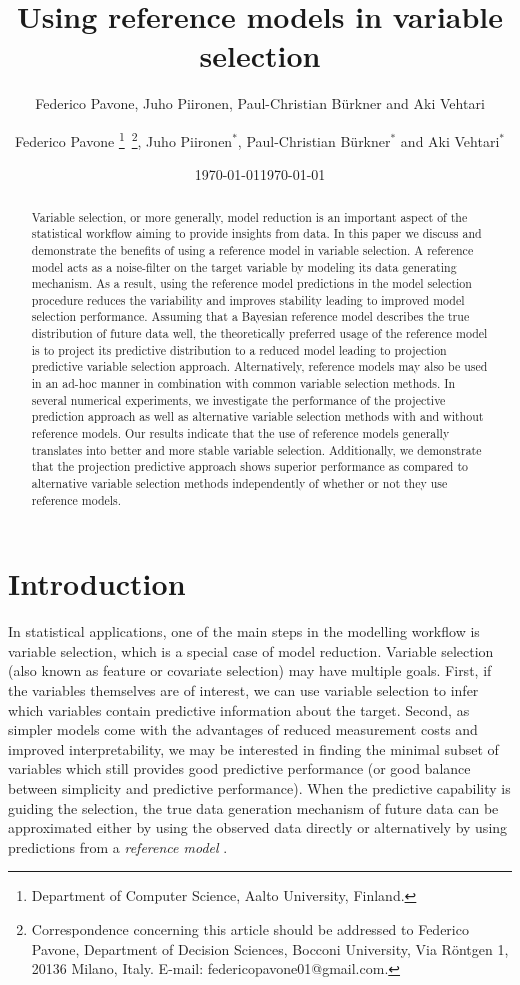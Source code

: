 \documentclass[a4]{article}
\title{Using reference models in variable selection 
	\vspace{.1in}}
\author{Federico Pavone, Juho Piironen, Paul-Christian B\"{u}rkner and Aki Vehtari}
\author{
    Federico Pavone \footnote{Department of Computer Science, Aalto University, Finland.} $\,$\footnote{Correspondence concerning this article should be addressed to Federico Pavone, Department of Decision Sciences, Bocconi University, Via R\"{o}ntgen 1, 20136 Milano, Italy. E-mail: federicopavone01@gmail.com.}, 
  Juho Piironen$^*$,
  Paul-Christian B\"{u}rkner$^*$
  and Aki Vehtari$^*$
  }
\date{\today}
\date{\today}
\theoremstyle{definition}
\begin{document}
\maketitle
\begin{abstract}
  Variable selection, or more generally, model reduction is an important aspect of the statistical workflow aiming to provide insights from data. In this paper we discuss and demonstrate the benefits of using a reference model in variable selection. A reference model acts as a noise-filter on the target variable by modeling its data generating mechanism. As a result, using the reference model predictions in the model selection procedure reduces the variability and improves stability leading to improved model selection performance. Assuming that a Bayesian reference model describes the true distribution of future data well, the theoretically preferred usage of the reference model is to project its predictive distribution to a reduced model leading to projection predictive variable selection approach. Alternatively, reference models may also be used in an ad-hoc manner in combination with common variable selection methods.  In several numerical experiments, we investigate the performance of the projective prediction approach as well as alternative variable selection methods with and without reference models. Our results indicate that the use of reference models generally translates into better and more stable variable selection. Additionally, we demonstrate that the projection predictive approach shows superior performance as compared to alternative variable selection methods independently of whether or not they use reference models.
\end{abstract}

\hypertarget{introduction}{%
\section{Introduction}\label{introduction}}

In statistical applications, one of the main steps in the modelling
workflow is variable selection, which is a special case of
model reduction. Variable selection (also known as feature or 
covariate selection) may have multiple goals.  First,
if the variables themselves are of interest, we can use variable
selection to infer which variables contain predictive information
about the target. Second, as simpler models come with the
advantages of reduced measurement costs and improved interpretability,
we may be interested in finding the minimal subset of variables which
still provides good predictive performance (or good balance between
simplicity and predictive performance).  When the predictive
capability is guiding the selection, the true data generation
mechanism of future data can be approximated either by using the
observed data directly or alternatively by using predictions from a
\emph{reference model} \citep{vehtari2012survey}.
\end{document}
